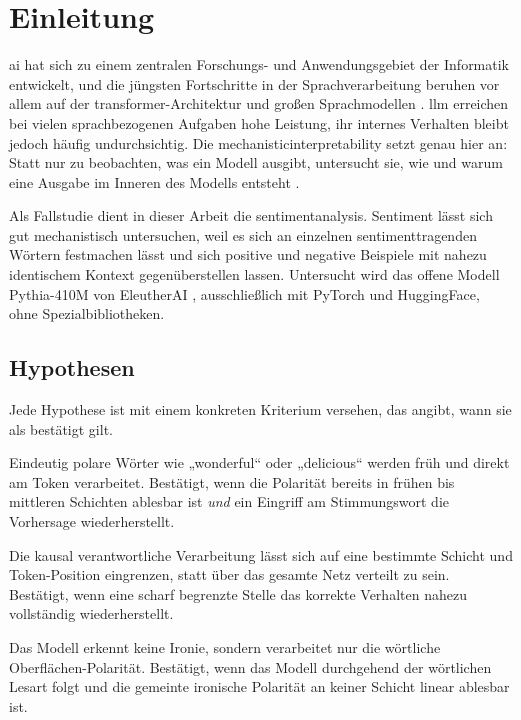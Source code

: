 \section{Einleitung}

\gls{ai} hat sich zu einem zentralen Forschungs- und Anwendungsgebiet der Informatik entwickelt, und die jüngsten Fortschritte in der Sprachverarbeitung beruhen vor allem auf der \gls{transformer}-Architektur und großen Sprachmodellen \cite{vaswani2017attention, radford2018improving}. \gls{llm} erreichen bei vielen sprachbezogenen Aufgaben hohe Leistung, ihr internes Verhalten bleibt jedoch häufig undurchsichtig. Die \gls{mechanisticinterpretability} setzt genau hier an: Statt nur zu beobachten, was ein Modell ausgibt, untersucht sie, wie und warum eine Ausgabe im Inneren des Modells entsteht \cite{nanda2023comprehensive, elhage2021mathematical}.

Als Fallstudie dient in dieser Arbeit die \gls{sentimentanalysis}. Sentiment lässt sich gut mechanistisch untersuchen, weil es sich an einzelnen sentimenttragenden Wörtern festmachen lässt und sich positive und negative Beispiele mit nahezu identischem Kontext gegenüberstellen lassen. Untersucht wird das offene Modell Pythia-410M von EleutherAI \cite{biderman2023pythia}, ausschließlich mit PyTorch und HuggingFace, ohne Spezialbibliotheken.

\subsection{Hypothesen}

Jede Hypothese ist mit einem konkreten Kriterium versehen, das angibt, wann sie als bestätigt gilt.

\begin{description}[style=nextline, leftmargin=0pt, font=\bfseries, itemsep=0.4em]
  \item[H1 (klare Stimmungswörter)] Eindeutig polare Wörter wie „wonderful“ oder „delicious“ werden früh und direkt am Token verarbeitet. Bestätigt, wenn die Polarität bereits in frühen bis mittleren Schichten ablesbar ist \emph{und} ein Eingriff am Stimmungswort die Vorhersage wiederherstellt.
  \item[H2 (Lokalisierbarkeit)] Die kausal verantwortliche Verarbeitung lässt sich auf eine bestimmte Schicht und Token-Position eingrenzen, statt über das gesamte Netz verteilt zu sein. Bestätigt, wenn eine scharf begrenzte Stelle das korrekte Verhalten nahezu vollständig wiederherstellt.
  \item[H3 (Ironie und Sarkasmus)] Das Modell erkennt keine Ironie, sondern verarbeitet nur die wörtliche Oberflächen-Polarität. Bestätigt, wenn das Modell durchgehend der wörtlichen Lesart folgt und die gemeinte ironische Polarität an keiner Schicht linear ablesbar ist.
\end{description}

